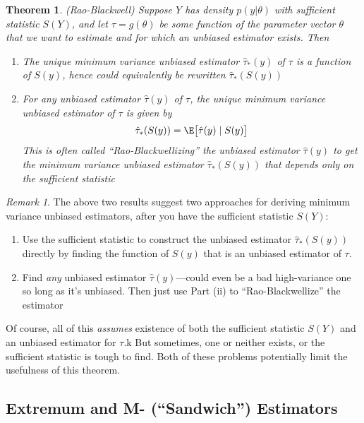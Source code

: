 \documentclass[12pt]{article}
\theoremstyle{plain}
\newtheorem{thm}{Theorem}[section]
\theoremstyle{definition}
\theoremstyle{remark}
\newtheorem*{rmk}{Remark}
\begin{document}
\begin{thm}\emph{(Rao-Blackwell)}
Suppose $Y$ has density $p(y|\theta)$ with sufficient statistic $S(Y)$,
and let $\tau=g(\theta)$ be some function of the parameter vector
$\theta$ that we want to estimate and for which an unbiased estimator
exists. Then
\begin{enumerate}[label=\emph{(\roman*)}]
  \item The unique minimum variance unbiased estimator
    $\hat{\tau}_*(y)$ of $\tau$ is a function of $S(y)$, hence could
    equivalently be rewritten $\hat{\tau}_*(S(y))$
  \item For \emph{any} unbiased estimator $\hat{\tau}(y)$ of
    $\tau$, the \emph{unique} \emph{minimum variance} unbiased estimator
    of $\tau$ is given by
    \begin{align*}
      \hat{\tau}_*(S(y))=\E\big[\hat{\tau}(y)\;|\;S(y)\big]
    \end{align*}
    This is often called ``Rao-Blackwellizing'' the unbiased
    estimator $\hat{\tau}(y)$ to get the \emph{minimum variance}
    unbiased estimator $\hat{\tau}_*(S(y))$ that depends only on the
    sufficient statistic
\end{enumerate}
\end{thm}
\begin{rmk}
The above two results suggest two approaches for deriving minimum
variance unbiased estimators, after you have the sufficient statistic
$S(Y)$:
\begin{enumerate}[label=(\roman*)]
  \item Use the sufficient statistic to construct the unbiased estimator
    $\hat{\tau}_*(S(y))$ directly by finding the function of $S(y)$
    that is an unbiased estimator of $\tau$.
  \item Find \emph{any} unbiased estimator $\hat{\tau}(y)$---could even
    be a bad high-variance one so long as it's unbiased.
    Then just use Part (ii) to ``Rao-Blackwellize'' the estimator
\end{enumerate}
Of course, all of this \emph{assumes} existence of both the sufficient
statistic $S(Y)$ and an unbiased estimator for $\tau$.k
But sometimes, one or neither exists, or the sufficient statistic is
tough to find.  Both of these problems potentially limit the usefulness
of this theorem.
\end{rmk}


\clearpage
\subsection{Extremum and M- (``Sandwich'') Estimators}
\end{document}
